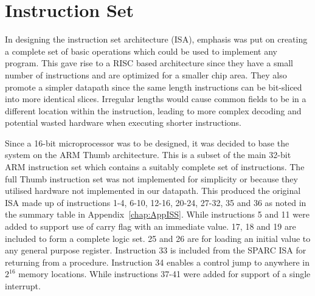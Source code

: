 
\chapter{Instruction Set}

In designing the instruction set architecture (ISA), emphasis was put on creating a complete set of basic operations which could be used to implement any program. 
This gave rise to a RISC based architecture since they have a small number of instructions and are optimized for a smaller chip area. 
They also promote a simpler datapath since the same length instructions can be bit-sliced into more identical slices. 
Irregular lengths would cause common fields to be in a different location within the instruction, leading to more complex decoding and potential wasted hardware when executing shorter instructions. 

Since a 16-bit microprocessor was to be designed, it was decided to base the system on the ARM Thumb architecture. 
This is a subset of the main 32-bit ARM instruction set which contains a suitably complete set of instructions. 
The full Thumb instruction set was not implemented for simplicity or because they utilised hardware not implemented in our datapath.
This produced the original ISA made up of instructions 1-4, 6-10, 12-16, 20-24, 27-32, 35 and 36 as noted in the summary table in Appendix~\ref{chap:AppISS}. 
While instructions 5 and 11 were added to support use of carry flag with an immediate value.
17, 18 and 19 are included to form a complete logic set. 
25 and 26 are for loading an initial value to any general purpose register. 
Instruction 33 is included from the SPARC ISA for returning from a procedure. 
Instruction 34 enables a control jump to anywhere in $2^{16}$ memory locations. 
While instructions 37-41 were added for support of a single interrupt.

